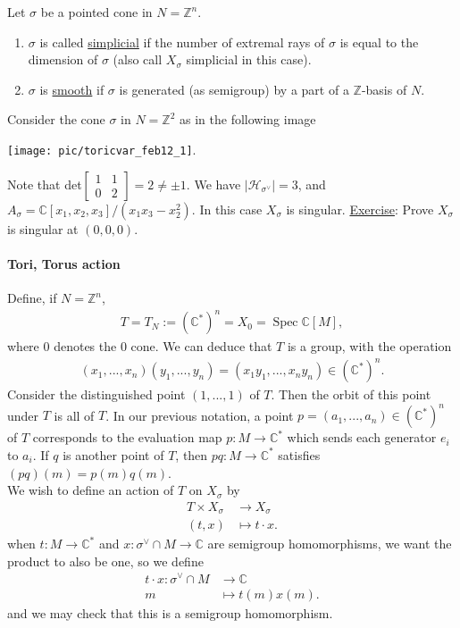 \documentclass[a4paper,12pt]{amsart}
\newcommand{\ZZ}{\mathbb{Z}}
\newcommand{\CC}{\mathbb{C}}
\DeclareMathOperator{\Spec}{Spec}
\begin{document}
\begin{Def}
Let $\sigma$ be a pointed cone in $N = \ZZ^n$. 
\begin{enumerate}
	\item $\sigma$ is called \underline{simplicial} if the number of extremal rays of $\sigma$ is equal to the dimension of $\sigma$ (also call $X_\sigma$ simplicial in this case).
	\item $\sigma$ is \underline{smooth} if $\sigma$ is generated (as semigroup) by a part of a $\ZZ$-basis of $N$.
\end{enumerate}
\end{Def}

\begin{Eg}
Consider the cone $\sigma$ in $N = \ZZ^2$ as in the following image
\begin{center}
	\texttt{[image: pic/toricvar\_feb12\_1]}.
\end{center}
Note that det$\begin{bmatrix}
1 & 1 \\
0 & 2 
\end{bmatrix} = 2 \neq \pm 1$. We have $|\mathcal{H}_{\sigma^\vee}| = 3$, and $A_\sigma = \CC[x_1, x_2, x_3] / (x_1 x_3 - x_2^2)$. In this case $X_\sigma$ is singular. \underline{Exercise}: Prove $X_\sigma$ is singular at $(0,0,0)$.	
\end{Eg}


\paragraph{Tori, Torus action}
Define, if $N = \ZZ^n$, 
\begin{align*}
	T = T_N := (\CC^*)^n = X_0 = \Spec \CC[M],
\end{align*}
where $0$ denotes the $0$ cone. We can deduce that $T$ is a group, with the operation 
\begin{align*}
	(x_1, ..., x_n)(y_1, ..., y_n) = (x_1 y_1, ... , x_n y_n) \in (\CC^*)^n.
\end{align*}
Consider the distinguished point $(1, ..., 1)$ of $T$. Then the orbit of this point under $T$ is all of $T$. In our previous notation, a point $p = (a_1, ..., a_n) \in (\CC^*)^n$ of $T$ corresponds to the evaluation map $p: M \to \CC^*$ which sends each generator $e_i$ to $a_i$. If $q$ is another point of $T$, then $pq: M \to \CC^*$ satisfies $(pq)(m) = p(m) q(m)$. \\

We wish to define an action of $T$ on $X_\sigma$ by 
\begin{align*}
	T \times X_\sigma &\to X_\sigma \\
	(t,x) &\mapsto t \cdot x.
\end{align*}
when $t: M \to \CC^*$ and $x: \sigma^\vee \cap M \to \CC$ are semigroup homomorphisms, we want the product to also be one, so we define
\begin{align*}
		t \cdot x: \sigma^\vee \cap M &\to \CC \\
	m &\mapsto t(m) x(m).
\end{align*}
and we may check that this is a semigroup homomorphism.
\end{document}
